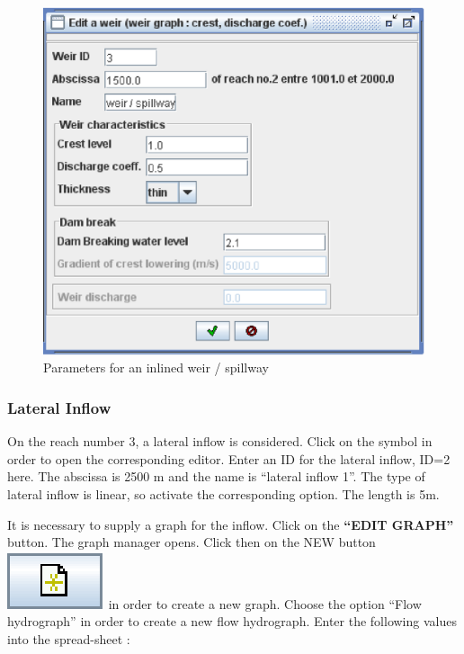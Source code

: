 \documentclass[a4paper,12pt]{article}
\begin{document}
\begin{figure}[h]
  \begin{center}
  \includegraphics[scale=0.6]{param_weir}
  \caption{Parameters for an inlined weir / spillway}
  \label{fig:Param_spillway}
  \end{center}
\end{figure}



\subsubsection{Lateral Inflow }

\hspace{0.5cm}On the reach number 3, a lateral inflow is considered. Click on the
symbol in order to open the corresponding editor. Enter an ID for
the lateral inflow, ID=2 here. The abscissa is 2500 m and the name
is {}``lateral inflow 1''. The type of lateral inflow is linear,
so activate the corresponding option. The length is 5m.

\vspace{0.5cm}

It is necessary to supply a graph for the inflow. Click on the \textbf{{}``EDIT
GRAPH''} button. The graph manager opens. Click then on the NEW button
\includegraphics[scale=0.6]{new} in
order to create a new graph. Choose the option {}``Flow hydrograph''
in order to create a new flow hydrograph. Enter the following values
into the spread-sheet :
\end{document}
